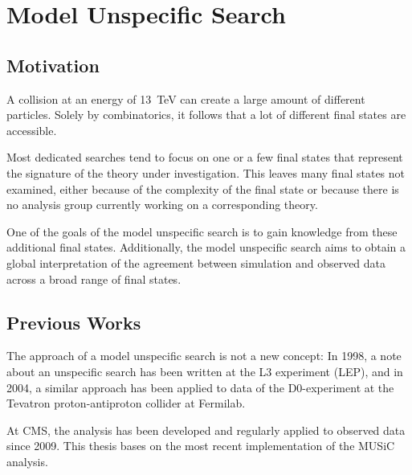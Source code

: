 
\chapter{Model Unspecific Search}

\section{Motivation}
A collision at an energy of \SI{13}{\TeV} can create a large amount of different particles. Solely by combinatorics, it follows that a lot of different final states are accessible.

Most dedicated searches tend to focus on one or a few final states that represent the signature of the theory under investigation. This leaves many final states not examined, either because of the complexity of the final state or because there is no analysis group currently working on a corresponding theory.

One of the goals of the model unspecific search is to gain knowledge from these additional final states. Additionally, the model unspecific search aims to obtain a global interpretation of the agreement between simulation and observed data across a broad range of final states.

\section{Previous Works}
The approach of a model unspecific search is not a new concept: In 1998, a note about an unspecific search has been written at the L3 experiment (\ac{LEP})\cite{Hebbeker:GlobalComparisonL3}, and in 2004, a similar approach has been applied to data of the D0-experiment at the Tevatron proton-antiproton collider at Fermilab\cite{Biallass:ModelIndependentSearch}.

At \ac{CMS}, the analysis has been developed and regularly applied to observed data since 2009\cite{Schmitz:ModelUnspecificSearch,Hof:ImplementationModelIndependent,Dietz-Laursonn:ModelUnspecificSearch,Olschewski:StudyAlternativeStatistical,Brodski:ModelUnspecificSearch,Pieta:MUSiCModelUnspecific,Papacz:ModelUnspecificSearch,Albert:ExtensionModelUnspecific,Roemer:ModelUnspecificSearch,Knutzen:softwarereinterpretationmodel,Durchardt:MUSiCModelUnspecific}. 
This thesis bases on the most recent implementation of the \ac{MUSiC} analysis.

